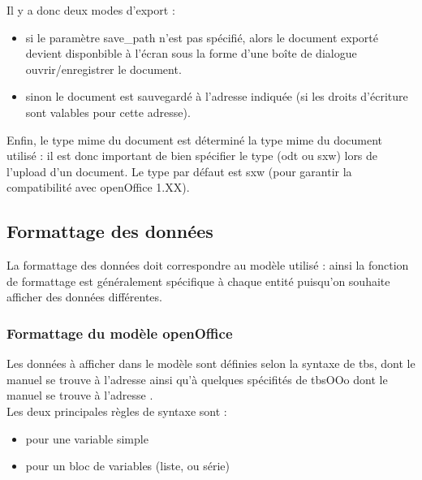 Il y a donc deux modes d'export : \\
\begin{itemize}
 \item si le paramètre save\_path n'est pas spécifié, alors le document exporté devient disponbible à l'écran sous la forme d'une boîte de dialogue ouvrir/enregistrer le document.
 \item sinon le document est sauvegardé à l'adresse indiquée (si les droits d'écriture sont valables pour cette adresse).
\end{itemize}

Enfin, le type mime du document est déterminé la type mime du document \obm utilisé : il est donc important de bien spécifier le type (odt ou  sxw) lors de l'upload d'un document. Le type par défaut est sxw (pour garantir la compatibilité avec openOffice 1.XX). \\

\subsection{Formattage des données}


La formattage des données doit correspondre au modèle utilisé : ainsi la fonction de formattage est généralement spécifique à chaque entité puisqu'on souhaite afficher des données différentes. \\

\subsubsection{Formattage du modèle openOffice}

Les données à afficher dans le modèle sont définies selon la syntaxe de tbs, dont le manuel se trouve à l'adresse  ainsi qu'à quelques spécifités de tbsOOo dont le manuel se trouve à l'adresse . \\

Les deux principales règles de syntaxe sont : 
\begin{itemize}
 \item pour une variable simple \\
 \item pour un bloc de variables (liste, ou série) \\
\end{itemize}


